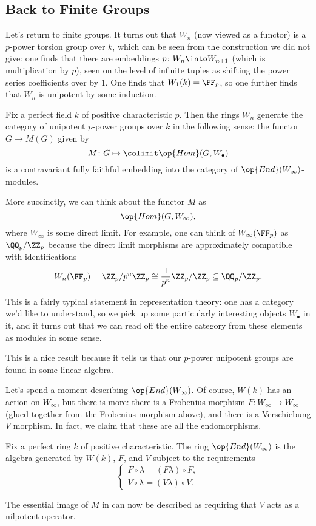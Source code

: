 \documentclass[../notes.tex]{subfiles}
\begin{document}
\subsection{Back to Finite Groups}
Let's return to finite groups. It turns out that $W_n$ (now viewed as a functor) is a $p$-power torsion group over $k$, which can be seen from the construction we did not give: one finds that there are embeddings $p\colon W_n\into W_{n+1}$ (which is multiplication by $p$), seen on the level of infinite tuples as shifting the power series coefficients over by $1$. One finds that $W_1(k)=\FF_p$, so one further finds that $W_n$ is unipotent by some induction.
\begin{theorem} \label{thm:witt-for-finite-groups}
	Fix a perfect field $k$ of positive characteristic $p$. Then the rings $W_n$ generate the category of unipotent $p$-power groups over $k$ in the following sense: the functor $G\to M(G)$ given by
	\[M\colon G\mapsto\colimit\op{Hom}(G,W_\bullet)\]
	is a contravariant fully faithful embedding into the category of $\op{End}(W_\infty)$-modules.
\end{theorem}
\begin{remark}
	More succinctly, we can think about the functor $M$ as
	\[\op{Hom}(G,W_\infty),\]
	where $W_\infty$ is some direct limit. For example, one can think of $W_\infty(\FF_p)$ as $\QQ_p/\ZZ_p$ because the direct limit morphisms are approximately compatible with identifications
	\[W_n(\FF_p)=\ZZ_p/p^n\ZZ_p\cong\frac1{p^n}\ZZ_p/\ZZ_p\subseteq\QQ_p/\ZZ_p.\]
\end{remark}
\begin{remark}
	This is a fairly typical statement in representation theory: one has a category we'd like to understand, so we pick up some particularly interesting objects $W_\bullet$ in it, and it turns out that we can read off the entire category from these elements as modules in some sense.
\end{remark}
This is a nice result because it tells us that our $p$-power unipotent groups are found in some linear algebra.

Let's spend a moment describing $\op{End}(W_\infty)$. Of course, $W(k)$ has an action on $W_\infty$, but there is more: there is a Frobenius morphism $F\colon W_\infty\to W_\infty$ (glued together from the Frobenius morphism above), and there is a Verschiebung $V$ morphism. In fact, we claim that these are all the endomorphisms.
\begin{lemma}
	Fix a perfect ring $k$ of positive characteristic. The ring $\op{End}(W_\infty)$ is the algebra generated by $W(k)$, $F$, and $V$ subject to the requirements
	\[\begin{cases}
		F\circ\lambda = (F\lambda)\circ F, \\
		V\circ\lambda = (V\lambda)\circ V.
	\end{cases}\]
\end{lemma}
\begin{remark}
	The essential image of $M$ in  can now be described as requiring that $V$ acts as a nilpotent operator.
\end{remark}
\end{document}
